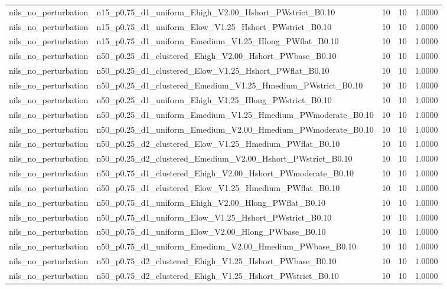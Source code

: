 \begin{tabular}{llrrr}
nils_no_perturbation & n15_p0.75_d1_uniform_Ehigh_V2.00_Hshort_PWstrict_B0.10 & 10 & 10 & 1.0000 \\
nils_no_perturbation & n15_p0.75_d1_uniform_Elow_V1.25_Hshort_PWstrict_B0.10 & 10 & 10 & 1.0000 \\
nils_no_perturbation & n15_p0.75_d1_uniform_Emedium_V1.25_Hlong_PWflat_B0.10 & 10 & 10 & 1.0000 \\
nils_no_perturbation & n50_p0.25_d1_clustered_Ehigh_V2.00_Hshort_PWbase_B0.10 & 10 & 10 & 1.0000 \\
nils_no_perturbation & n50_p0.25_d1_clustered_Elow_V1.25_Hshort_PWflat_B0.10 & 10 & 10 & 1.0000 \\
nils_no_perturbation & n50_p0.25_d1_clustered_Emedium_V1.25_Hmedium_PWstrict_B0.10 & 10 & 10 & 1.0000 \\
nils_no_perturbation & n50_p0.25_d1_uniform_Ehigh_V1.25_Hlong_PWstrict_B0.10 & 10 & 10 & 1.0000 \\
nils_no_perturbation & n50_p0.25_d1_uniform_Emedium_V1.25_Hmedium_PWmoderate_B0.10 & 10 & 10 & 1.0000 \\
nils_no_perturbation & n50_p0.25_d1_uniform_Emedium_V2.00_Hmedium_PWmoderate_B0.10 & 10 & 10 & 1.0000 \\
nils_no_perturbation & n50_p0.25_d2_clustered_Elow_V1.25_Hmedium_PWflat_B0.10 & 10 & 10 & 1.0000 \\
nils_no_perturbation & n50_p0.25_d2_clustered_Emedium_V2.00_Hshort_PWstrict_B0.10 & 10 & 10 & 1.0000 \\
nils_no_perturbation & n50_p0.75_d1_clustered_Ehigh_V2.00_Hshort_PWmoderate_B0.10 & 10 & 10 & 1.0000 \\
nils_no_perturbation & n50_p0.75_d1_clustered_Elow_V1.25_Hmedium_PWflat_B0.10 & 10 & 10 & 1.0000 \\
nils_no_perturbation & n50_p0.75_d1_uniform_Ehigh_V2.00_Hlong_PWflat_B0.10 & 10 & 10 & 1.0000 \\
nils_no_perturbation & n50_p0.75_d1_uniform_Elow_V1.25_Hshort_PWstrict_B0.10 & 10 & 10 & 1.0000 \\
nils_no_perturbation & n50_p0.75_d1_uniform_Elow_V2.00_Hlong_PWbase_B0.10 & 10 & 10 & 1.0000 \\
nils_no_perturbation & n50_p0.75_d1_uniform_Emedium_V2.00_Hmedium_PWbase_B0.10 & 10 & 10 & 1.0000 \\
nils_no_perturbation & n50_p0.75_d2_clustered_Ehigh_V1.25_Hshort_PWbase_B0.10 & 10 & 10 & 1.0000 \\
nils_no_perturbation & n50_p0.75_d2_clustered_Ehigh_V1.25_Hshort_PWstrict_B0.10 & 10 & 10 & 1.0000 \\

\end{tabular}
